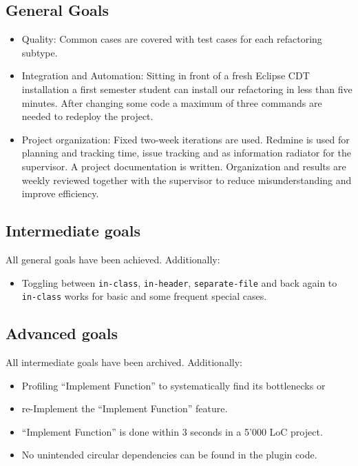 \documentclass[a4paper,10pt]{scrreprt}
\begin{document}
\pagebreak

\subsection*{General Goals}

\begin{itemize}
 \item Quality: Common cases are covered with test cases for each
refactoring subtype.
 \item Integration and Automation: Sitting in front of a fresh Eclipse CDT installation a first
semester student can install our refactoring in less than five minutes. After changing some code a maximum of three commands are needed to redeploy the project.
 \item Project organization: Fixed two-week iterations are used. Redmine is used for planning and tracking time, issue tracking and as information radiator for the supervisor. A project documentation is written. Organization and results are weekly reviewed together with the supervisor to reduce misunderstanding and improve efficiency.
\end{itemize}

\subsection*{Intermediate goals}
All general goals have been achieved. Additionally:
\begin{itemize}
 \item Toggling between \texttt{in-class}, \texttt{in-header},
\texttt{separate-file} and back again to \texttt{in-class} works for basic and some frequent special cases.
\end{itemize}

\subsection*{Advanced goals}
All intermediate goals have been archived. Additionally:
\begin{itemize}
 \item Profiling ``Implement Function'' to systematically find its bottlenecks or
 \item re-Implement the ``Implement Function'' feature.
 \item ``Implement Function'' is done within 3 seconds in a 5'000 LoC project.
 \item No unintended circular dependencies can be found in the plugin code.
\end{itemize}
\end{document}
